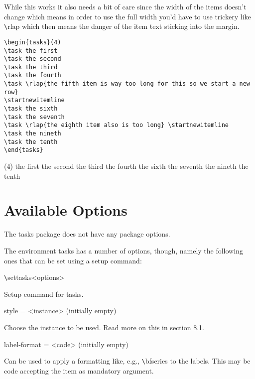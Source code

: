 \documentclass[a4paper,12pt,indent]{article}
\begin{document}
While this works it also needs a bit of care since the width of the items doesn’t change which
means in order to use the full width you’d have to use trickery like \verb|\|\textcolor{Tasks}{rlap} which then means
the danger of the item text sticking into the margin.

\begin{tcolorbox}[collower=black,colframe=Tasks,colback=white]
    \begin{lstlisting}
\begin{tasks}(4)
\task the first
\task the second
\task the third
\task the fourth
\task \rlap{the fifth item is way too long for this so we start a new row}
\startnewitemline
\task the sixth
\task the seventh
\task \rlap{the eighth item also is too long} \startnewitemline
\task the nineth
\task the tenth
\end{tasks}
\end{lstlisting}
        \tcblower
        \begin{tasks}(4)
            \task the first
            \task the second
            \task the third
            \task the fourth
            \task {}
            \startnewitemline
            \task the sixth
            \task the seventh
            \task {} \startnewitemline
            \task the nineth
            \task the tenth
            \end{tasks}
           \end{tcolorbox}

\section{Available Options}
The tasks package does not have any package options.

The environment tasks has a number of options, though, namely the following ones that
can be set using a setup command:

\verb|\|\textcolor{Tasks}{settasks{<options>}}

Setup command for tasks.

style = {<instance>} \hfill (initially empty)

Choose the instance to be used. Read more on this in section 8.1.

label-format = {<code>} \hfill (initially empty)

Can be used to apply a formatting like, e.g., \verb|\|\textcolor{Tasks}{bfseries} to the labels. This may be code accepting
the item as mandatory argument.
\end{document}
